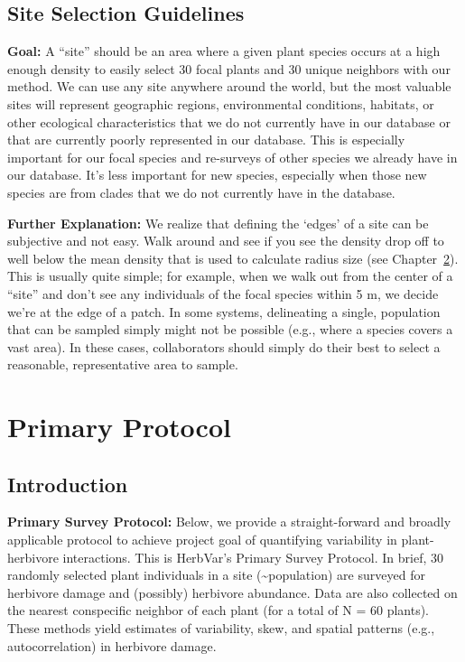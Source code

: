 \documentclass[
  letterpaper,
  oneside,
  open=any]{scrbook}
\begin{document}
\section{Site Selection Guidelines}\label{site-selection-guidelines}

\textbf{Goal:} A ``site'' should be an area where a given plant species
occurs at a high enough density to easily select 30 focal plants and 30
unique neighbors with our method. We can use any site anywhere around
the world, but the most valuable sites will represent geographic
regions, environmental conditions, habitats, or other ecological
characteristics that we do not currently have in our database or that
are currently poorly represented in our database. This is especially
important for our focal species and re-surveys of other species we
already have in our database. It's less important for new species,
especially when those new species are from clades that we do not
currently have in the database.

\textbf{Further Explanation:} We realize that defining the `edges' of a
site can be subjective and not easy. Walk around and see if you see the
density drop off to well below the mean density that is used to
calculate radius size (see Chapter~\ref{sec-primary}). This is usually
quite simple; for example, when we walk out from the center of a
``site'' and don't see any individuals of the focal species within 5 m,
we decide we're at the edge of a patch. In some systems, delineating a
single, population that can be sampled simply might not be possible
(e.g., where a species covers a vast area). In these cases,
collaborators should simply do their best to select a reasonable,
representative area to sample.

\chapter{Primary Protocol}\label{sec-primary}

\section{Introduction}\label{introduction-1}

\textbf{Primary Survey Protocol:} Below, we provide a straight-forward
and broadly applicable protocol to achieve project goal of quantifying
variability in plant-herbivore interactions. This is HerbVar's Primary
Survey Protocol. In brief, 30 randomly selected plant individuals in a
site (\textasciitilde population) are surveyed for herbivore damage and
(possibly) herbivore abundance. Data are also collected on the nearest
conspecific neighbor of each plant (for a total of N = 60 plants). These
methods yield estimates of variability, skew, and spatial patterns
(e.g., autocorrelation) in herbivore damage.
\end{document}
